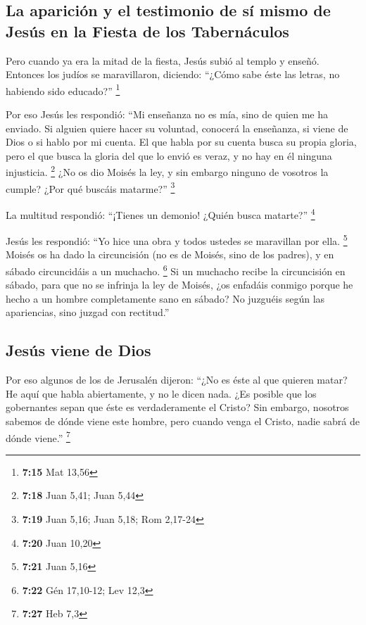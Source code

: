 \begin{paracol}{2}
\hypertarget{la-apariciuxf3n-y-el-testimonio-de-suxed-mismo-de-jesuxfas-en-la-fiesta-de-los-tabernuxe1culos}{%
\subsection{La aparición y el testimonio de sí mismo de Jesús en la
Fiesta de los
Tabernáculos}\label{la-apariciuxf3n-y-el-testimonio-de-suxed-mismo-de-jesuxfas-en-la-fiesta-de-los-tabernuxe1culos}}

 Pero cuando ya era la mitad de la fiesta, Jesús subió al
templo y enseñó.  Entonces los judíos se maravillaron,
diciendo: ``¿Cómo sabe éste las letras, no habiendo sido educado?''
\footnote{\textbf{7:15} Mat 13,56}

 Por eso Jesús les respondió: ``Mi enseñanza no es mía,
sino de quien me ha enviado.  Si alguien quiere hacer su
voluntad, conocerá la enseñanza, si viene de Dios o si hablo por mi
cuenta.  El que habla por su cuenta busca su propia
gloria, pero el que busca la gloria del que lo envió es veraz, y no hay
en él ninguna injusticia. \footnote{\textbf{7:18} Juan 5,41; Juan 5,44}
 ¿No os dio Moisés la ley, y sin embargo ninguno de
vosotros la cumple? ¿Por qué buscáis matarme?'' \footnote{\textbf{7:19}
  Juan 5,16; Juan 5,18; Rom 2,17-24}

 La multitud respondió: ``¡Tienes un demonio! ¿Quién
busca matarte?'' \footnote{\textbf{7:20} Juan 10,20}

 Jesús les respondió: ``Yo hice una obra y todos ustedes
se maravillan por ella. \footnote{\textbf{7:21} Juan 5,16}
 Moisés os ha dado la circuncisión (no es de Moisés, sino
de los padres), y en sábado circuncidáis a un muchacho. \footnote{\textbf{7:22}
  Gén 17,10-12; Lev 12,3}  Si un muchacho recibe la
circuncisión en sábado, para que no se infrinja la ley de Moisés, ¿os
enfadáis conmigo porque he hecho a un hombre completamente sano en
sábado?  No juzguéis según las apariencias, sino juzgad
con rectitud.''

\hypertarget{jesuxfas-viene-de-dios}{%
\subsection{Jesús viene de Dios}\label{jesuxfas-viene-de-dios}}

 Por eso algunos de los de Jerusalén dijeron: ``¿No es
éste al que quieren matar?  He aquí que habla
abiertamente, y no le dicen nada. ¿Es posible que los gobernantes sepan
que éste es verdaderamente el Cristo?  Sin embargo,
nosotros sabemos de dónde viene este hombre, pero cuando venga el
Cristo, nadie sabrá de dónde viene.'' \footnote{\textbf{7:27} Heb 7,3}


\end{paracol}
